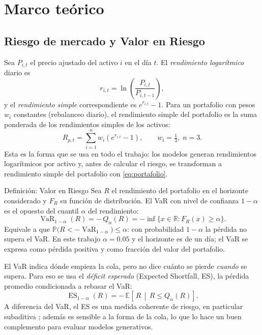 \documentclass[12pt,letterpaper]{article}
\newcommand{\R}{\mathbb{R}}
\newcommand{\E}{\mathbb{E}}
\newcommand{\Prob}{\mathbb{P}}
\newcommand{\VaR}{\operatorname{VaR}}
\newcommand{\ES}{\operatorname{ES}}
\begin{document}
\section{Marco teórico}\label{sec:marco}

\subsection{Riesgo de mercado y Valor en Riesgo}

Sea $P_{i,t}$ el precio ajustado del activo $i$ en el día $t$. El \emph{rendimiento logarítmico} diario es
\begin{equation}
  r_{i,t} = \ln\!\left(\frac{P_{i,t}}{P_{i,t-1}}\right),
\end{equation}
y el \emph{rendimiento simple} correspondiente es $e^{r_{i,t}}-1$. Para un portafolio con pesos $w_i$ constantes (rebalanceo diario), el rendimiento simple del portafolio es la suma ponderada de los rendimientos simples de los activos:
\begin{equation}\label{eq:portafolio}
  R_{p,t} = \sum_{i=1}^{n} w_i\left(e^{r_{i,t}}-1\right), \qquad w_i=\tfrac13,\; n=3.
\end{equation}
Esta es la forma que se usa en todo el trabajo: los modelos generan rendimientos logarítmicos por activo y, antes de calcular el riesgo, se transforman a rendimiento simple del portafolio con \eqref{eq:portafolio}.

\begin{cajadef}{Definición: Valor en Riesgo}
Sea $R$ el rendimiento del portafolio en el horizonte considerado y $F_R$ su función de distribución. El VaR con nivel de confianza $1-\alpha$ es el opuesto del cuantil $\alpha$ del rendimiento:
\begin{equation}\label{eq:var}
  \VaR_{1-\alpha}(R) = -\,Q_\alpha(R) = -\inf\{x\in\R : F_R(x)\ge \alpha\}.
\end{equation}
Equivale a que $\Prob\big(R < -\VaR_{1-\alpha}\big) \le \alpha$: con probabilidad $1-\alpha$ la pérdida no supera el VaR. En este trabajo $\alpha=0.05$ y el horizonte es de un día; el VaR se expresa como pérdida positiva y como fracción del valor del portafolio.
\end{cajadef}

El VaR indica dónde empieza la cola, pero no dice cuánto se pierde \emph{cuando} se supera. Para eso se usa el \emph{déficit esperado} (Expected Shortfall, ES), la pérdida promedio condicionada a rebasar el VaR:
\begin{equation}\label{eq:es}
  \ES_{1-\alpha}(R) = -\,\E\!\left[\,R \,\middle|\, R \le Q_\alpha(R)\right].
\end{equation}
A diferencia del VaR, el ES es una medida coherente de riesgo, en particular subaditiva \cite{acerbi2002}; además es sensible a la forma de la cola, lo que lo hace un buen complemento para evaluar modelos generativos.
\end{document}
